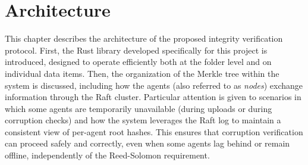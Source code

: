 \chapter{Architecture}

 This chapter describes the architecture of the proposed integrity verification protocol. First, the Rust library developed specifically for this project is introduced, designed to operate efficiently both at the folder level and on individual data items. Then, the organization of the Merkle tree within the system is discussed, including how the agents (also referred to as \textit{nodes}) exchange information through the Raft cluster. Particular attention is given to scenarios in which some agents are temporarily unavailable (during uploads or during corruption checks) and how the system leverages the Raft log to maintain a consistent view of per-agent root hashes. This ensures that corruption verification can proceed safely and correctly, even when some agents lag behind or remain offline, independently of the Reed-Solomon requirement.




